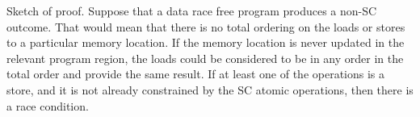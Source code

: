 Sketch of proof. Suppose that a data race free program produces a non-SC
outcome. That would mean that there is no total ordering on the loads or stores
to a particular memory location. If the memory location is never updated in the
relevant program region, the loads could be considered to be in any order in
the total order and provide the same result. If at least one of the operations
is a store, and it is not already constrained by the SC atomic operations, then
there is a race condition.




